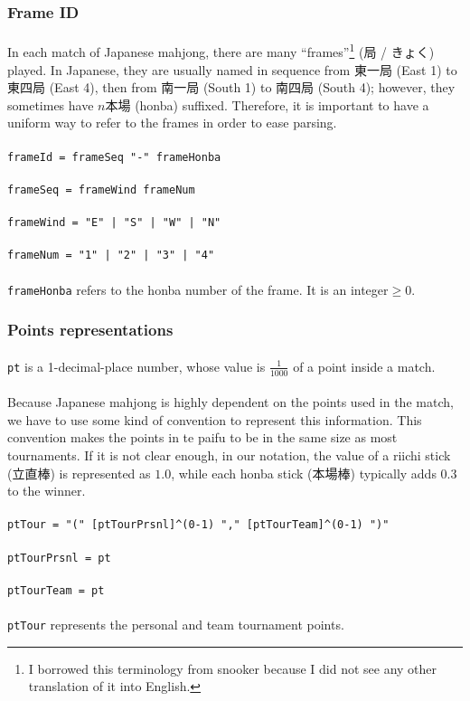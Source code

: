 \documentclass[%
	a4paper%
	,10pt%
	,twoside%
	,notitlepage%
]{article}%
\newcommand*{\ruleSymbol}{\textjapanese{⚠}}%
\newcommand*{\ruleMargin}{\marginpar{\flushright{}\ruleSymbol{}}}%
\newcommand*{\rulePar}{\paragraph*{\ruleMargin{}}}%
\begin{document}
		\subsubsection{Frame ID}\label{subsubsec:frameid}%
			\paragraph*{}In each match of Japanese mahjong, there are many ``frames''\footnote{I borrowed this terminology from snooker because I did not see any other translation of it into English. } (\textjapanese{局} / \textjapanese{きょく}) played. In Japanese, they are usually named in sequence from \textjapanese{東一局} (East 1) to \textjapanese{東四局} (East 4), then from \textjapanese{南一局} (South 1) to \textjapanese{南四局} (South 4); however, they sometimes have $n$\textjapanese{本場} (honba) suffixed. Therefore, it is important to have a uniform way to refer to the frames in order to ease parsing. %
			\rulePar{}\lstinline/frameId = frameSeq "-" frameHonba/%
			\rulePar{}\lstinline/frameSeq = frameWind frameNum/%
			\rulePar{}\lstinline/frameWind = "E" | "S" | "W" | "N"/%
			\rulePar{}\lstinline/frameNum = "1" | "2" | "3" | "4"/%
			\rulePar{}\lstinline/frameHonba/ refers to the honba number of the frame. It is an integer${} \ge 0$. %
		\subsubsection{Points representations}\label{subsubsec:pt}%
			\rulePar{}\lstinline/pt/ is a 1-decimal-place number, whose value is $\frac{1}{1000}$ of a point inside a match. %
			\paragraph*{}Because Japanese mahjong is highly dependent on the points used in the match, we have to use some kind of convention to represent this information. This convention makes the points in te paifu to be in the same size as most tournaments. If it is not clear enough, in our notation, the value of a riichi stick (\textjapanese{立直棒}) is represented as $1.0$, while each honba stick (\textjapanese{本場棒}) typically adds $0.3$ to the winner. %
			\rulePar{}\lstinline/ptTour = "(" [ptTourPrsnl]^(0-1) "," [ptTourTeam]^(0-1) ")"/%
			\rulePar{}\lstinline/ptTourPrsnl = pt/%
			\rulePar{}\lstinline/ptTourTeam = pt/%
			\paragraph*{}\lstinline/ptTour/ represents the personal and team tournament points. %
\end{document}
